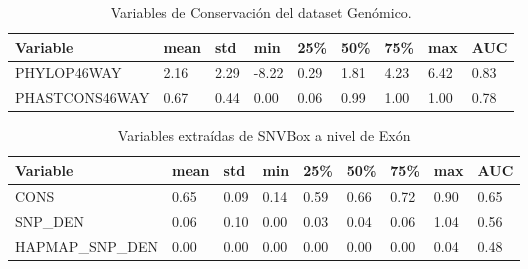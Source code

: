 \begin{table}[H]
\centering
\begin{tabular}{|l|l|l|l|l|l|l|l|l|}
\hline
Variable & mean & std & min & 25\%  & 50\% & 75\%  & max & AUC \\ \hline
PHYLOP46WAY & 2.16 &  2.29 & -8.22 &  0.29 &  1.81 &  4.23 &  6.42 & 0.83 \\ \hline
PHASTCONS46WAY & 0.67 & 0.44 &  0.00 &  0.06 &  0.99 &  1.00 &  1.00 & 0.78 \\ \hline
\end{tabular}
\caption{Variables de Conservación del dataset Genómico.}
\label{conservacion_vars}
\end{table}

\begin{table}[H]
\centering
\begin{tabular}{|l|l|l|l|l|l|l|l|l|}
\hline
Variable         & mean & std  & min  & 25\% & 50\% & 75\% & max & AUC  \\ \hline
CONS             & 0.65 & 0.09 & 0.14 & 0.59 & 0.66 & 0.72 & 0.90 & 0.65 \\ \hline
SNP\_DEN         & 0.06 & 0.10 & 0.00 & 0.03 & 0.04 & 0.06 & 1.04 & 0.56 \\ \hline
HAPMAP\_SNP\_DEN & 0.00 & 0.00 & 0.00 & 0.00 & 0.00 & 0.00 & 0.04 & 0.48 \\ \hline
\end{tabular}
\caption{Variables extraídas de SNVBox a nivel de Exón}
\label{snvbox_vars}
\end{table}


